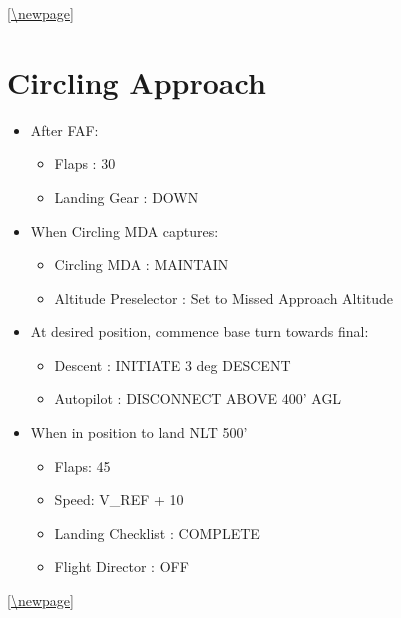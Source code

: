 \autoref{\newpage}

\section{Circling Approach}
\label{circlingapproach}

\begin{itemize}
\item After FAF:

\begin{itemize}
\item Flaps : 30

\item Landing Gear : DOWN

\end{itemize}

\item When Circling MDA captures:

\begin{itemize}
\item Circling MDA : MAINTAIN

\item Altitude Preselector : Set to Missed Approach Altitude

\end{itemize}

\item At desired position, commence base turn towards final:

\begin{itemize}
\item Descent : INITIATE 3 deg DESCENT

\item Autopilot : DISCONNECT ABOVE 400' AGL

\end{itemize}

\item When in position to land NLT 500'

\begin{itemize}
\item Flaps: 45

\item Speed: V\_REF + 10

\item Landing Checklist : COMPLETE

\item Flight Director : OFF

\end{itemize}

\end{itemize}

\autoref{\newpage}



